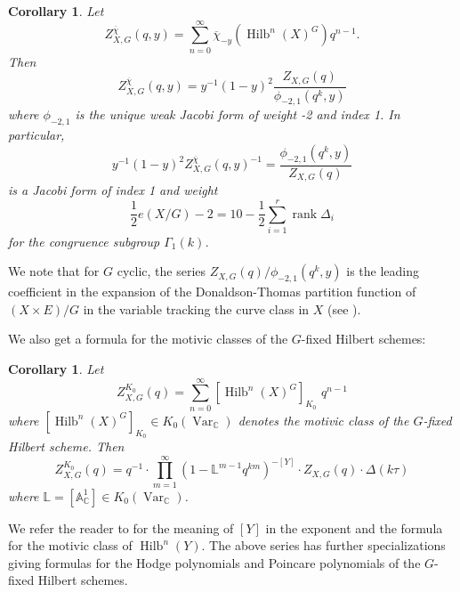 \documentclass{amsart}
\newtheorem{corollary}[theorem]{Corollary}
\theoremstyle{definition}
\newcommand{\half}{\frac{1}{2}}
\newcommand{\CC} {{\mathbb C}}          %
\newcommand{\LL}{\mathbb{L}}
\newcommand{\chibar}{\overline{\chi}}
\newcommand{\Hilb}{\operatorname{Hilb}}
\begin{document}
\begin{corollary}\label{cor: Zchiy formula}
Let
\[
Z^{\chibar}_{X,G}(q,y) = \sum_{n=0}^{\infty}
\chibar_{-y}\left(\Hilb^{n}(X)^{G} \right) q^{n-1} .
\]
Then
\[
Z^{\chibar}_{X,G}(q,y) = y^{-1}(1-y)^{2} \frac{Z_{X,G}(q)}{\phi_{-2,1}(q^{k},y)}
\]
where $\phi_{-2,1}$ is the unique weak Jacobi form of weight -2
and index 1. In particular,
\[
y^{-1}(1-y)^{2} Z^{\chibar}_{X,G}(q,y)^{-1} =\frac{
\phi_{-2,1}(q^{k},y)}{Z_{X,G}(q)} 
\]
is a Jacobi form of index 1 and weight 
\[
\half e(X/G)-2 = 10-\half \sum_{i=1}^{r} \operatorname{rank} \Delta_{i}
\]
for the congruence subgroup $\Gamma_{1}(k)$. 
\end{corollary}

We note that for $G$ cyclic, the series
$Z_{X,G}(q)/\phi_{-2,1}(q^{k},y) $ is the leading coefficient in the
expansion of the Donaldson-Thomas partition function of $(X\times
E)/G$ in the variable tracking the curve class in $X$ (see
\cite[Thm~0.1]{bryan2018chl}).

We also get a formula for the motivic classes of the $G$-fixed Hilbert schemes:


\begin{corollary}\label{cor: ZK0 formula}
Let 
\[
Z^{K_{0}}_{X,G}(q) = \sum_{n=0}^{\infty} [\Hilb^{n}(X)^{G}]_{K_{0}}\,\, q^{n-1}
\]
where $ [\Hilb^{n}(X)^{G}]_{K_{0}}\in K_{0}(\operatorname{Var}_{\CC})$
denotes the motivic class of the $G$-fixed Hilbert scheme. Then
\[
Z^{K_{0}}_{X,G}(q) = q^{-1}\cdot \prod_{m=1}^{\infty} \left(1-\LL^{m-1}
q^{km} \right)^{-[Y]}  \cdot Z_{X,G}(q)\cdot \Delta (k\tau )
\]
where $\LL  = [\mathbb{A}^{1}_{\CC}]\in
K_{0}(\operatorname{Var}_{\CC})$.
\end{corollary}
We refer the reader to \cite{GZ-L-MH-power} for the meaning
of $[Y]$ in the exponent and the formula for the motivic class of
$\Hilb^{n}(Y)$. The above series has further specializations giving formulas for the  Hodge polynomials and
Poincare polynomials of the $G$-fixed Hilbert schemes.
\end{document}
